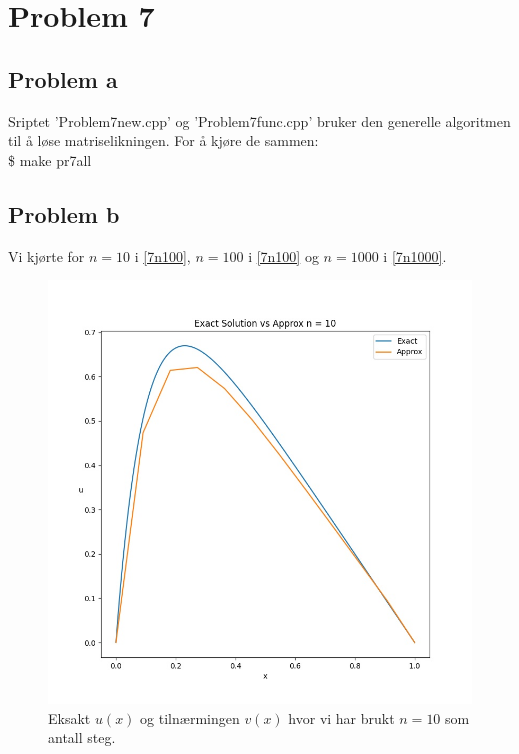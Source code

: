 \documentclass[english,notitlepage]{revtex4-1}  %
\begin{document}
\section*{Problem 7}

\subsection*{Problem a}

Sriptet 'Problem7new.cpp' og 'Problem7func.cpp' bruker den generelle algoritmen  til å løse matriselikningen. For å kjøre de sammen: \\

\$ make pr7all

\subsection*{Problem b}

Vi kjørte for $n = 10$ i \ref{7n100}, $n = 100$ i \ref{7n100} og $n = 1000$ i \ref{7n1000}. 

\begin{figure}
\centering
\includegraphics[scale=0.65]{Images/problem7NEW10.jpg}
\caption{Eksakt $u(x)$ og tilnærmingen $v(x)$ hvor vi har brukt $n = 10$ som antall steg.}
\label{7n10}
\end{figure}
\end{document}
